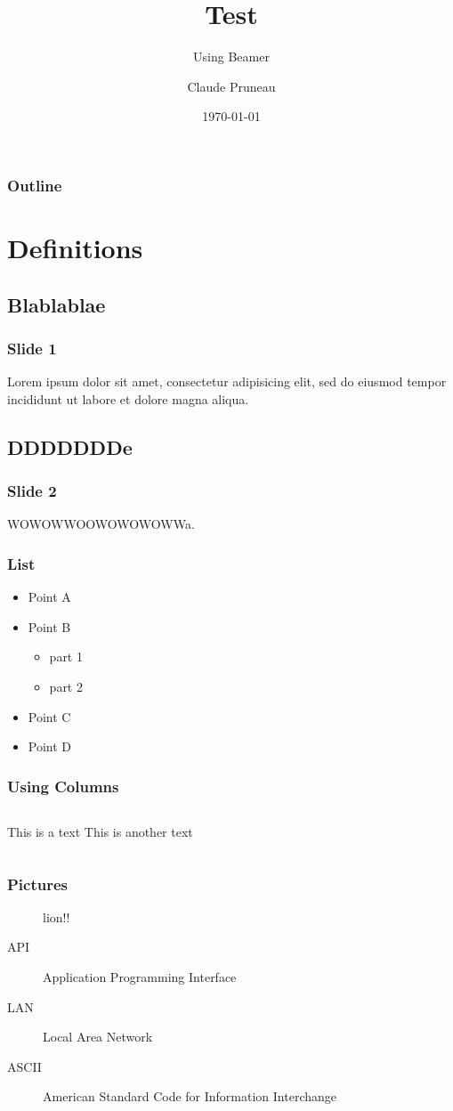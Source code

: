\documentclass{beamer}
\title{Test}
\subtitle{Using Beamer}
\author{Claude Pruneau}
\institute{Wayne State University}
\date{\today}
\begin{document}
\begin{frame}
	\titlepage
\end{frame}

\begin{frame}
	\frametitle{Outline}
	\tableofcontents
\end{frame}

\section{Definitions}

\subsection{Blablablae}
\begin{frame}
	\frametitle{Slide 1}
	Lorem ipsum dolor sit amet, consectetur adipisicing elit, sed do eiusmod tempor incididunt ut labore et dolore magna aliqua.
\end{frame}


\subsection{DDDDDDDe}
\begin{frame}
	\frametitle{Slide 2}
	WOWOWWOOWOWOWOWWa.
\end{frame}

\begin{frame}
	\frametitle{List}
	\begin{itemize}
		\item Point A
		\item Point B
		\begin{itemize}
			\item part 1
			\item part 2
		\end{itemize}
		\item Point C
		\item Point D
	\end{itemize}
\end{frame}

\begin{frame}
	\frametitle{Using Columns}
	\begin{columns}
		This is a text
		This is another text
	\end{columns}
\end{frame}


\begin{frame}
	\frametitle{Pictures}
	\begin{figure}
		\caption{lion!!}
	\end{figure}
	\begin{description}
		\item[API] Application Programming Interface
		\item[LAN] Local Area Network
		\item[ASCII] American Standard Code for Information Interchange
	\end{description}
\end{frame}
\end{document}
